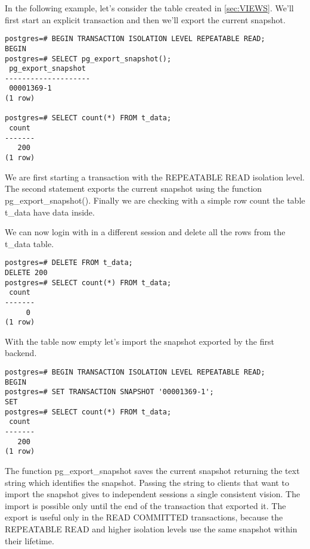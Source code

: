 In the following example, let's consider the table created in \ref{sec:VIEWS}. We'll first start an 
explicit transaction and then we'll export the current snapshot.

\begin{lstlisting}[style=pgsql]
postgres=# BEGIN TRANSACTION ISOLATION LEVEL REPEATABLE READ;
BEGIN
postgres=# SELECT pg_export_snapshot();
 pg_export_snapshot 
--------------------
 00001369-1
(1 row)

postgres=# SELECT count(*) FROM t_data;
 count 
-------
   200
(1 row)

\end{lstlisting}

We are first starting a transaction with the REPEATABLE READ isolation level. The second 
statement exports the current snapshot using the function pg\_export\_snapshot(). Finally we are 
checking with a simple row count the table t\_data have data inside.\newline

We can now login with in a different session and delete all the rows from the t\_data table.

\begin{lstlisting}[style=pgsql]
postgres=# DELETE FROM t_data;
DELETE 200
postgres=# SELECT count(*) FROM t_data;
 count 
-------
     0
(1 row)

\end{lstlisting}

With the table now empty let's import the snapshot exported by the first backend.

\begin{lstlisting}[style=pgsql]
postgres=# BEGIN TRANSACTION ISOLATION LEVEL REPEATABLE READ;
BEGIN
postgres=# SET TRANSACTION SNAPSHOT '00001369-1';
SET
postgres=# SELECT count(*) FROM t_data;
 count 
-------
   200
(1 row)

\end{lstlisting}

The function pg\_export\_snapshot saves the current snapshot returning the text string which 
identifies the snapshot. Passing the string to clients that want to import the snapshot gives to 
independent sessions a single consistent vision. The import is possible only until the end of the 
transaction that exported it. The export is useful only in the READ COMMITTED transactions, 
because the REPEATABLE READ and higher isolation levels use the same snapshot within their 
lifetime. 

